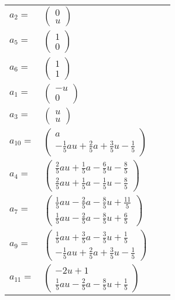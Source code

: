 \documentclass[1p]{elsarticle_modified}
\theoremstyle{definition}
\begin{document}
\begin{tabular}{m{7pt} m{180pt} m{7pt} m{180pt} }
\flushright $a_{2}=$&$\begin{pmatrix}0\\u\end{pmatrix}$ \\
\flushright $a_{5}=$&$\begin{pmatrix}1\\0\end{pmatrix}$ \\
\flushright $a_{6}=$&$\begin{pmatrix}1\\1\end{pmatrix}$ \\
\flushright $a_{1}=$&$\begin{pmatrix}- u\\0\end{pmatrix}$ \\
\flushright $a_{3}=$&$\begin{pmatrix}u\\u\end{pmatrix}$ \\
\flushright $a_{10}=$&$\begin{pmatrix}a\\-\frac{1}{5} a u+\frac{2}{5} a+\frac{3}{5} u-\frac{1}{5}\end{pmatrix}$ \\
\flushright $a_{4}=$&$\begin{pmatrix}\frac{2}{5} a u+\frac{1}{5} a-\frac{6}{5} u-\frac{8}{5}\\\frac{2}{5} a u+\frac{1}{5} a-\frac{1}{5} u-\frac{8}{5}\end{pmatrix}$ \\
\flushright $a_{7}=$&$\begin{pmatrix}\frac{1}{5} a u-\frac{2}{5} a-\frac{8}{5} u+\frac{11}{5}\\\frac{1}{5} a u-\frac{2}{5} a-\frac{8}{5} u+\frac{6}{5}\end{pmatrix}$ \\
\flushright $a_{9}=$&$\begin{pmatrix}\frac{1}{5} a u+\frac{3}{5} a-\frac{3}{5} u+\frac{1}{5}\\-\frac{1}{5} a u+\frac{2}{5} a+\frac{3}{5} u-\frac{1}{5}\end{pmatrix}$ \\
\flushright $a_{11}=$&$\begin{pmatrix}-2 u+1\\\frac{1}{5} a u-\frac{2}{5} a-\frac{8}{5} u+\frac{1}{5}\end{pmatrix}$ \\

\end{tabular}
\end{document}

